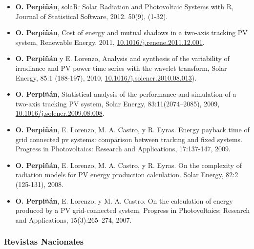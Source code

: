 \documentclass[article, a4paper]{memoir}
\begin{document}
\begin{itemize}
\item \textbf{O. Perpiñán}, solaR: Solar Radiation and Photovoltaic Systems with R,
Journal of Statistical Software, 2012. 50(9), (1-32).

\item \textbf{O. Perpiñán}, Cost of energy and mutual shadows in a two-axis
tracking PV system, Renewable Energy, 2011,
\url{10.1016/j.renene.2011.12.001}.

\item \textbf{O. Perpiñán} y E. Lorenzo, Analysis and synthesis of the
variability of irradiance and PV power time series with the wavelet
transform, Solar Energy, 85:1 (188-197), 2010,
\url{10.1016/j.solener.2010.08.013}).

\item \textbf{O. Perpiñán}, Statistical analysis of the performance and
simulation of a two-axis tracking PV system, Solar Energy,
83:11(2074–2085), 2009, \url{10.1016/j.solener.2009.08.008}.

\item \textbf{O. Perpiñán}, E. Lorenzo, M. A. Castro, y R. Eyras. Energy payback
time of grid connected pv systems: comparison between tracking and
fixed systems. Progress in Photovoltaics: Research and Applications,
17:137-147, 2009.

\item \textbf{O. Perpiñán}, E. Lorenzo, M. A. Castro, y R. Eyras. On the
complexity of radiation models for PV energy production
calculation. Solar Energy, 82:2 (125-131), 2008.

\item \textbf{O. Perpiñán}, E. Lorenzo, y M. A. Castro. On the calculation of
energy produced by a PV grid-connected system. Progress in
Photovoltaics: Research and Applications, 15(3):265–274, 2007.
\end{itemize}

\subsubsection{Revistas Nacionales}
\label{sec-5-2-2}
\end{document}
